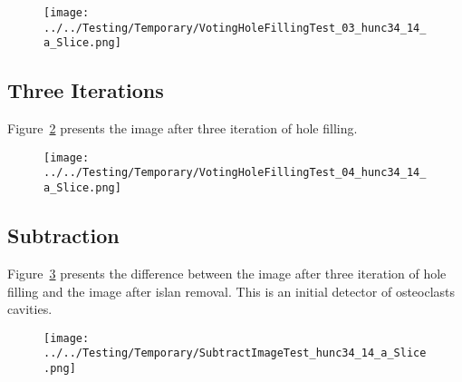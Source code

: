 \documentclass{InsightArticle}
\begin{document}
\begin{figure}
\center
\texttt{[image: ../../Testing/Temporary/VotingHoleFillingTest\_03\_hunc34\_14\_a\_Slice.png]}
\label{fig:HoleFillingIteration02Image2}
\end{figure}



\subsection{Three Iterations}

Figure~\ref{fig:HoleFillingIteration03Image3} presents the image after three iteration of hole filling.

\begin{figure}
\center
\texttt{[image: ../../Testing/Temporary/VotingHoleFillingTest\_04\_hunc34\_14\_a\_Slice.png]}
\label{fig:HoleFillingIteration03Image3}
\end{figure}



\subsection{Subtraction}

Figure~\ref{fig:SubtractionImage} presents the difference between the image
after three iteration of hole filling and the image after islan removal. This
is an initial detector of osteoclasts cavities.

\begin{figure}
\center
\texttt{[image: ../../Testing/Temporary/SubtractImageTest\_hunc34\_14\_a\_Slice.png]}
\label{fig:SubtractionImage}
\end{figure}


%
%



\end{document}
